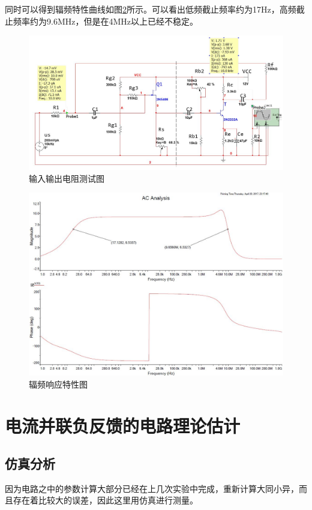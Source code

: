 \documentclass[UTF8,a4paper]{article}
\begin{document}
同时可以得到辐频特性曲线如图\ref{F}所示。可以看出低频截止频率约为17Hz，高频截止频率约为9.6MHz，但是在4MHz以上已经不稳定。

\begin{figure}
\centering
\includegraphics[width=\textwidth]{R.jpg}
\caption{输入输出电阻测试图}
\label{R}
\end{figure}

\begin{figure}
\centering
\includegraphics[width=\textwidth]{F.jpg}
\caption{辐频响应特性图}
\label{F}
\end{figure}

\section{电流并联负反馈的电路理论估计}
\subsection{仿真分析}
因为电路之中的参数计算大部分已经在上几次实验中完成，重新计算大同小异，而且存在着比较大的误差，因此这里用仿真进行测量。
\end{document}
